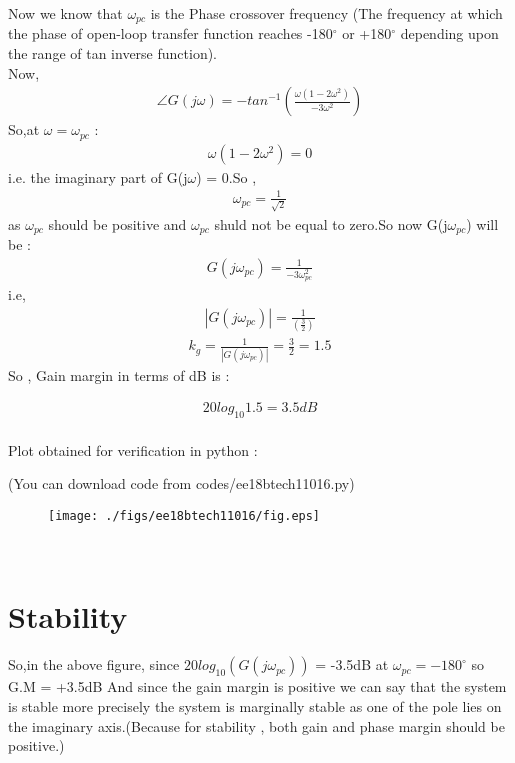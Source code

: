 \begin{enumerate}[label=\thesection.\arabic*.,ref=\thesection.\theenumi]
Now we know that $\omega_{pc}$ is the Phase crossover frequency (The frequency at which the phase of open-loop transfer function reaches -180$^{\circ}$ or +180$^{\circ}$ depending upon the range of tan inverse function).\\
Now,
\begin{align}
\angle G(j\omega)=- tan^{-1}(\frac{\omega(1-2\omega^2)}{-3\omega^2})
\end{align}
So,at $\omega=\omega_{pc}$ :
\begin{align}
\omega(1-2\omega^2) = 0 
\end{align}
i.e. the imaginary part of G(j$\omega$) = 0.So ,
\begin{align}
\omega_{pc} = \frac{1}{\sqrt{2}} 
\end{align}
as $\omega_{pc}$ should be positive and $\omega_{pc}$ shuld not be equal to zero.So now G(j$\omega_{pc}$) will be :
\begin{align}
G(j\omega_{pc}) = \frac{1}{-3\omega_{pc}^2}
\end{align}
i.e,
\begin{align}
|G(j\omega_{pc})| = \frac{1}{(\frac{3}{2})}
\end{align}
\begin{align}
k_{g}=\frac{1}{|G(j\omega_{pc})|} = \frac{3}{2}=1.5
\end{align}
So , Gain margin in terms of dB is :

\begin{align}
20log_{10}1.5 = 3.5dB
\end{align}
\\

Plot obtained for verification in python :

(You can download code from codes/ee18btech11016.py)
\begin{figure}[htp]
	\centering
	\texttt{[image: ./figs/ee18btech11016/fig.eps]}
	\caption{}
	\label{fig:Phase}
\end{figure}
\\

\section{Stability}

So,in the above figure, since $20log_{10}(G(j\omega_{pc}))$ = -3.5dB at $\omega_{pc} = -180^{\circ}$ so G.M = +3.5dB And since the gain margin is positive we can say that the system is stable more precisely the system is marginally stable as one of the pole lies on the imaginary axis.(Because for stability , both gain and phase margin should be positive.)
\\



\end{enumerate}
